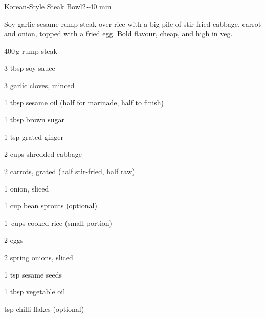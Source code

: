 \begin{recipebox}{Korean-Style Steak Bowl}{2}{\textasciitilde40 min}

Soy-garlic-sesame rump steak over rice with a big pile of stir-fried cabbage,
carrot and onion, topped with a fried egg. Bold flavour, cheap, and high in veg.

\begin{ingredients}
  \item 400\,g rump steak
  \item 3 tbsp soy sauce
  \item 3 garlic cloves, minced
  \item 1 tbsp sesame oil (half for marinade, half to finish)
  \item 1 tbsp brown sugar
  \item 1 tsp grated ginger
  \item 2 cups shredded cabbage
  \item 2 carrots, grated (half stir-fried, half raw)
  \item 1 onion, sliced
  \item 1 cup bean sprouts (optional)
  \item 1\,\textonequarter{} cups cooked rice (small portion)
  \item 2 eggs
  \item 2 spring onions, sliced
  \item 1 tsp sesame seeds
  \item 1 tbsp vegetable oil
  \item {} tsp chilli flakes (optional)
\end{ingredients}


\end{recipebox}
